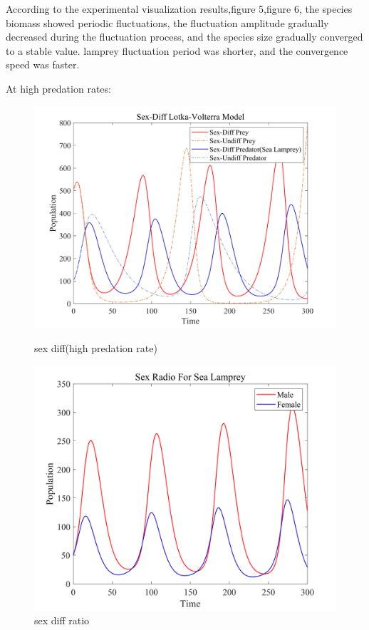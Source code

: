 \documentclass[12pt]{article}  %
\begin{document}
According to the experimental visualization results,figure 5,figure 6, the species biomass showed periodic fluctuations, the fluctuation amplitude gradually decreased during the fluctuation process, and the species size gradually converged to a stable value. lamprey fluctuation period was shorter, and the convergence speed was faster.\par

At high predation rates:
\begin{figure}[htbp]
	\begin{minipage}[b]{0.5\linewidth}
		\centering
		\includegraphics[width=\linewidth]{img/diff1.png}
		\caption{sex diff(high predation rate)}
	\end{minipage}%
	\begin{minipage}[b]{0.5\linewidth}
		\centering
		\includegraphics[width=\linewidth]{img/diff11.png}
		\caption{sex diff ratio}
	\end{minipage}
	\label{fi:3_1}
\end{figure}
\end{document}
